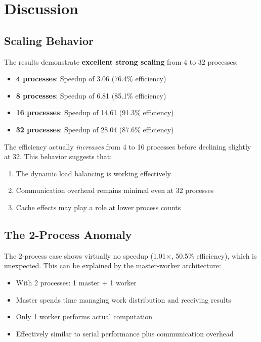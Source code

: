 \documentclass[11pt,a4paper]{article}
\begin{document}
	\section{Discussion}
	
	\subsection{Scaling Behavior}
	
	The results demonstrate \textbf{excellent strong scaling} from 4 to 32 processes:
	\begin{itemize}
		\item \textbf{4 processes}: Speedup of 3.06 (76.4\% efficiency)
		\item \textbf{8 processes}: Speedup of 6.81 (85.1\% efficiency)
		\item \textbf{16 processes}: Speedup of 14.61 (91.3\% efficiency)
		\item \textbf{32 processes}: Speedup of 28.04 (87.6\% efficiency)
	\end{itemize}
	
	The efficiency actually \textit{increases} from 4 to 16 processes before declining slightly at 32. This behavior suggests that:
	\begin{enumerate}
		\item The dynamic load balancing is working effectively
		\item Communication overhead remains minimal even at 32 processes
		\item Cache effects may play a role at lower process counts
	\end{enumerate}
	
	\subsection{The 2-Process Anomaly}
	
	The 2-process case shows virtually no speedup (1.01×, 50.5\% efficiency), which is unexpected. This can be explained by the master-worker architecture:
	\begin{itemize}
		\item With 2 processes: 1 master + 1 worker
		\item Master spends time managing work distribution and receiving results
		\item Only 1 worker performs actual computation
		\item Effectively similar to serial performance plus communication overhead
	\end{itemize}
	
\end{document}
